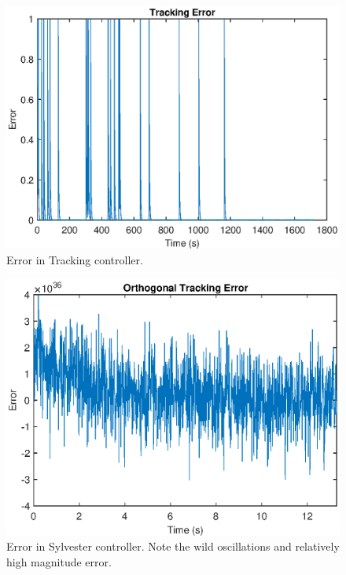 \documentclass[oneside, 11pt]{book}
\begin{document}
\begin{figure}[!htbp]
    \centering
    \includegraphics{images/campus_tracking_error.eps}
    \caption{Error in Tracking controller.}
    \label{fig:mock_campus_tracking_error}
\end{figure}

\begin{figure}[!htbp]
    \centering
    \includegraphics{images/campus_sylvester_error.eps}
    \caption{Error in Sylvester controller. Note the wild oscillations and relatively high magnitude error.}
    \label{fig:mock_campus_sylvester}
\end{figure}
\end{document}
